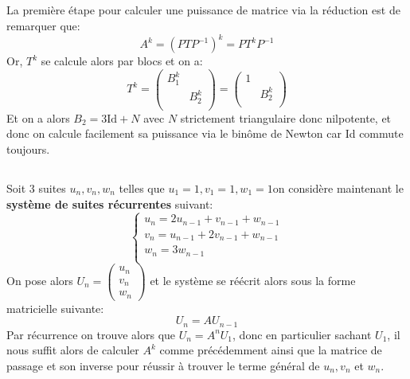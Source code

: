 \subsection*{}
La première étape pour calculer une puissance de matrice via la réduction est de remarquer que:
\[
   A^k = (PTP^{-1})^k = PT^kP^{-1}   
\]
Or, \(T^k\) se calcule alors par blocs et on a:
\[
   T^k = \begin{pmatrix}
      B_1^k & \\
      & B_2^k \\
   \end{pmatrix} = \begin{pmatrix}
      1 & \\
      & B_2^k \\
   \end{pmatrix}
\]
Et on a alors \(B_2 = 3\text{Id} + N\) avec \(N\) strictement triangulaire donc nilpotente, et donc on calcule facilement sa puissance via le binôme de Newton car Id commute toujours.

\subsection*{}
Soit \(3\) suites \(u_n, v_n, w_n\) telles que \(u_1 = 1, v_1 = 1, w_1 = 1\)on considère maintenant le \textbf{système de suites récurrentes} suivant:
\[
   \begin{cases}
      u_{n} = 2u_{n - 1} + v_{n - 1} + w_{n - 1}\\
      v_{n} = u_{n - 1} + 2v_{n - 1} + w_{n - 1}\\
      w_{n} = 3w_{n - 1}\\
   \end{cases}   
\]
On pose alors \(U_n = \begin{pmatrix}
   u_n \\ v_n \\ w_n
\end{pmatrix}\) et le système se réécrit alors sous la forme matricielle suivante:
\[
   U_{n} = AU_{n - 1}   
\]
Par récurrence on trouve alors que \(U_{n} = A^nU_1\), donc en particulier sachant \(U_1\), il nous suffit alors de calculer \(A^k\) comme précédemment ainsi que la matrice de passage et son inverse pour réussir à trouver le terme général de \(u_n, v_n\) et \(w_n\).\<

